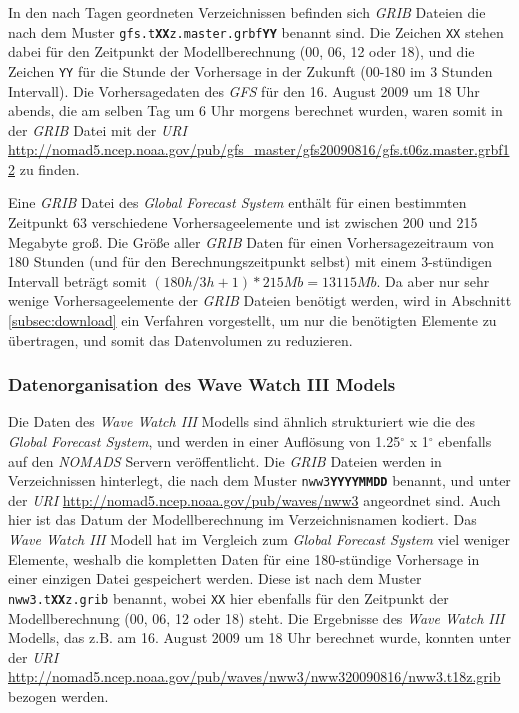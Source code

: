 In den nach Tagen geordneten Verzeichnissen befinden sich
\textit{GRIB} Dateien die nach dem Muster
\texttt{gfs.t\textbf{XX}z.master.grbf\textbf{YY}} benannt sind. Die Zeichen
\texttt{XX} stehen dabei für den Zeitpunkt der Modellberechnung (00,
06, 12 oder 18), und die Zeichen \texttt{YY} für die Stunde der
Vorhersage in der Zukunft (00-180 im 3 Stunden Intervall). Die
Vorhersagedaten des \textit{GFS} für den 16. August 2009 um 18 Uhr
abends, die am selben Tag um 6 Uhr morgens berechnet wurden, waren
somit in der \textit{GRIB} Datei mit der \textit{URI}
\url{http://nomad5.ncep.noaa.gov/pub/gfs_master/gfs20090816/gfs.t06z.master.grbf12}
zu finden.

Eine \textit{GRIB} Datei des \textit{Global Forecast System} enthält
für einen bestimmten Zeitpunkt 63 verschiedene Vorhersageelemente und
ist zwischen 200 und 215 Megabyte groß. Die Größe aller \textit{GRIB}
Daten für einen Vorhersagezeitraum von 180 Stunden (und für den
Berechnungszeitpunkt selbst) mit einem 3-stündigen Intervall beträgt
somit $(180h / 3h + 1) * 215 Mb = 13115 Mb$. Da aber nur sehr wenige
Vorhersageelemente der \textit{GRIB} Dateien benötigt werden, wird in
Abschnitt \ref{subsec:download} ein Verfahren vorgestellt, um nur die
benötigten Elemente zu übertragen, und somit das Datenvolumen zu
reduzieren.

\subsubsection{Datenorganisation des Wave Watch III Models}

Die Daten des \textit{Wave Watch III} Modells sind ähnlich
strukturiert wie die des \textit{Global Forecast System}, und werden
in einer Auflösung von 1.25$^{\circ}$ x 1$^{\circ}$ ebenfalls auf den
\textit{NOMADS} Servern veröffentlicht. Die \textit{GRIB} Dateien
werden in Verzeichnissen hinterlegt, die nach dem Muster
\texttt{nww3\textbf{YYYYMMDD}} benannt, und unter der \textit{URI}
\url{http://nomad5.ncep.noaa.gov/pub/waves/nww3} angeordnet sind. Auch
hier ist das Datum der Modellberechnung im Verzeichnisnamen
kodiert. Das \textit{Wave Watch III} Modell hat im Vergleich zum
\textit{Global Forecast System} viel weniger Elemente, weshalb die
kompletten Daten für eine 180-stündige Vorhersage in einer einzigen
Datei gespeichert werden. Diese ist nach dem Muster
\texttt{nww3.t\textbf{XX}z.grib} benannt, wobei \texttt{XX} hier
ebenfalls für den Zeitpunkt der Modellberechnung (00, 06, 12 oder 18)
steht. Die Ergebnisse des \textit{Wave Watch III} Modells, das z.B. am
16. August 2009 um 18 Uhr berechnet wurde, konnten unter der
\textit{URI}
\url{http://nomad5.ncep.noaa.gov/pub/waves/nww3/nww320090816/nww3.t18z.grib}
bezogen werden.

